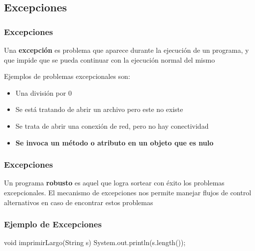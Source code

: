 \documentclass{beamer}
\begin{document}
\subsection{Excepciones}

\begin{frame}
  \frametitle{Excepciones}

  \begin{block}{}
    Una \textbf{excepción} es problema que aparece durante la
    ejecución de un programa, y que impide que se pueda continuar con
    la ejecución normal del mismo
  \end{block}

  \begin{block}{}
    Ejemplos de problemas excepcionales son:

    \begin{itemize}
    \item Una división por 0      
    \item Se está tratando de abrir un archivo pero este no existe     
    \item Se trata de abrir una conexión de red, pero no hay
      conectividad      
    \item \textbf{Se invoca un método o atributo en un objeto que es nulo}
    \end{itemize}
  \end{block}
  
\end{frame}

\begin{frame}
  \frametitle{Excepciones}

  \begin{block}{}
    Un programa \textbf{robusto} es aquel que logra sortear con éxito
    los problemas excepcionales. El mecanismo de excepciones nos
    permite manejar flujos de control alternativos en caso de
    encontrar estos problemas
  \end{block}
  
\end{frame}

\begin{frame}[fragile]
  \frametitle{Ejemplo de Excepciones}

\begin{jsmall}
void imprimirLargo(String s) {
    System.out.println(s.length());
}
\end{jsmall}

  
\end{frame}
\end{document}
